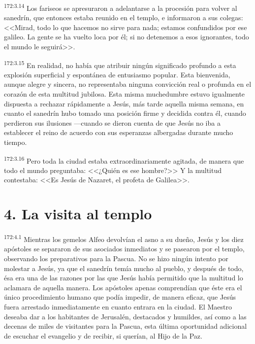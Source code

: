 \par 
\textsuperscript{172:3.14} Los fariseos se apresuraron a adelantarse a la procesión para volver al sanedrín, que entonces estaba reunido en el templo, e informaron a sus colegas: <<Mirad, todo lo que hacemos no sirve para nada; estamos confundidos por ese galileo. La gente se ha vuelto loca por él; si no detenemos a esos ignorantes, todo el mundo le seguirá>>.

\par 
\textsuperscript{172:3.15} En realidad, no había que atribuir ningún significado profundo a esta explosión superficial y espontánea de entusiasmo popular. Esta bienvenida, aunque alegre y sincera, no representaba ninguna convicción real o profunda en el corazón de esta multitud jubilosa. Esta misma muchedumbre estuvo igualmente dispuesta a rechazar rápidamente a Jesús, más tarde aquella misma semana, en cuanto el sanedrín hubo tomado una posición firme y decidida contra él, cuando perdieron sus ilusiones ---cuando se dieron cuenta de que Jesús no iba a establecer el reino de acuerdo con sus esperanzas albergadas durante mucho tiempo.

\par 
\textsuperscript{172:3.16} Pero toda la ciudad estaba extraordinariamente agitada, de manera que todo el mundo preguntaba: <<¿Quién es ese hombre?>> Y la multitud contestaba: <<Es Jesús de Nazaret, el profeta de Galilea>>.

\section*{4. La visita al templo}
\par 
\textsuperscript{172:4.1} Mientras los gemelos Alfeo devolvían el asno a su dueño, Jesús y los diez apóstoles se separaron de sus asociados inmediatos y se pasearon por el templo, observando los preparativos para la Pascua. No se hizo ningún intento por molestar a Jesús, ya que el sanedrín temía mucho al pueblo, y después de todo, ésa era una de las razones por las que Jesús había permitido que la multitud lo aclamara de aquella manera. Los apóstoles apenas comprendían que éste era el único procedimiento humano que podía impedir, de manera eficaz, que Jesús fuera arrestado inmediatamente en cuanto entrara en la ciudad. El Maestro deseaba dar a los habitantes de Jerusalén, destacados y humildes, así como a las decenas de miles de visitantes para la Pascua, esta última oportunidad adicional de escuchar el evangelio y de recibir, si querían, al Hijo de la Paz.

